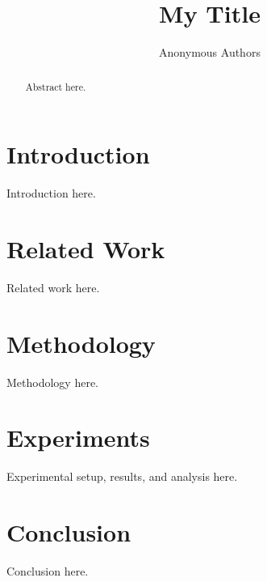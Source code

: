 \documentclass[10pt,twocolumn,letterpaper]{article}
\title{My Title}
\author{Anonymous Authors}
\begin{document}
\maketitle

\begin{abstract}
Abstract here.
\end{abstract}

\section{Introduction}
\label{sec:intro}
Introduction here.

\section{Related Work}
\label{sec:related_work}
Related work here.

\section{Methodology}
\label{sec:method}
Methodology here.

\section{Experiments}
\label{sec:experiments}
Experimental setup, results, and analysis here.

\section{Conclusion}
\label{sec:conclusion}
Conclusion here.

{
    \small
    
    
}

\end{document}
